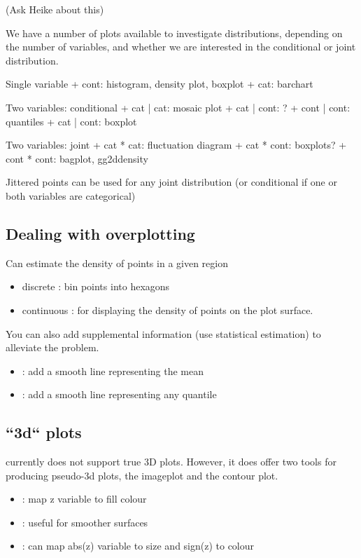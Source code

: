 (Ask Heike about this)

We have a number of plots available to investigate distributions, depending on the number of variables, and whether we are interested in the conditional or joint distribution.

Single variable
+ cont: histogram, density plot, boxplot
+ cat:  barchart

Two variables: conditional
+ cat  | cat:  mosaic plot
+ cat  | cont: ?
+ cont | cont: quantiles
+ cat  | cont: boxplot

Two variables: joint
+ cat  * cat:  fluctuation diagram
+ cat  * cont: boxplots?
+ cont * cont: bagplot, gg2ddensity

Jittered points can be used for any joint distribution (or conditional if one or both variables are categorical)

\subsection{Dealing with overplotting}\label{sec:overplotting}

Can estimate the density of points in a given region

\begin{itemize}
	\item discrete : bin points into hexagons
	\item continuous : for displaying the density of points on the plot surface.
\end{itemize}

You can also add supplemental information (use statistical estimation) to alleviate the problem.

\begin{itemize}
	\item {}: add a smooth line representing the mean
	\item {}: add a smooth line representing any quantile
\end{itemize}

\subsection{``3d`` plots}\label{sub:_3d_plots}

 currently does not support true 3D plots.  However, it does offer two tools for producing pseudo-3d plots, the imageplot and the contour plot.

\begin{itemize}
	\item {}: map z variable to fill colour
	\item {}: useful for smoother surfaces
	\item {}: can map abs(z) variable to size and sign(z) to colour
\end{itemize}

